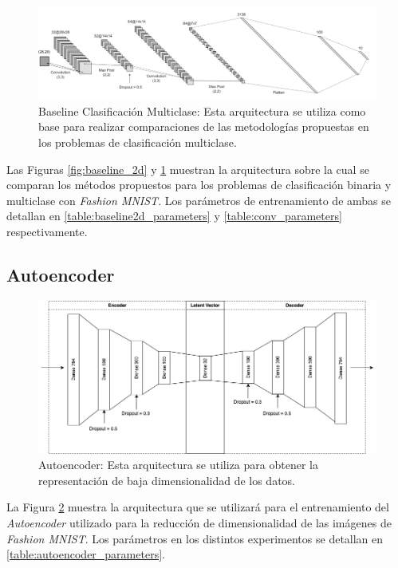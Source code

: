 \begin{figure}[ht]
    \centering
    \includegraphics[width=15cm]{img/tesis/conv.drawio.png}
    \caption{Baseline Clasificación Multiclase: Esta arquitectura se utiliza como base para realizar comparaciones de las metodologías propuestas en los problemas de clasificación multiclase.}
    \label{fig:conv}
\end{figure}

Las Figuras \ref{fig:baseline_2d} y \ref{fig:conv} muestran la arquitectura sobre la cual se comparan los métodos propuestos para los problemas de clasificación binaria y multiclase con \textit{Fashion MNIST}. Los parámetros de entrenamiento de ambas se detallan en \ref{table:baseline2d_parameters} y \ref{table:conv_parameters} respectivamente. 

\subsection{Autoencoder}

\begin{figure}[ht]
    \centering
    \includegraphics[width=14cm]{img/tesis/autoencoder_arquitectura.png}
    \caption{Autoencoder: Esta arquitectura se utiliza para obtener la representación de baja dimensionalidad de los datos.}
    \label{fig:autoencoder_arquitectura}
\end{figure}

La Figura \ref{fig:autoencoder_arquitectura} muestra la arquitectura que se utilizará para el entrenamiento del \textit{Autoencoder} utilizado para la reducción de dimensionalidad de las imágenes de \textit{Fashion MNIST}. Los parámetros en los distintos experimentos se detallan en \ref{table:autoencoder_parameters}.

